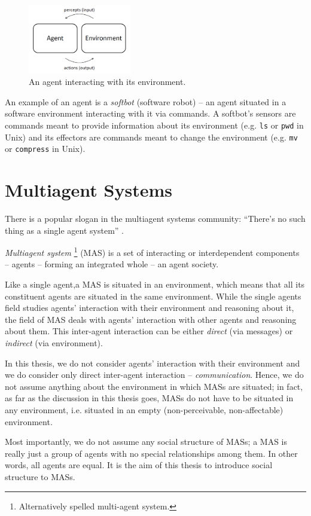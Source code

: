 \begin{figure}[h]
	\centering
	\includegraphics[width=0.4\textwidth]{images/agent-environment-interaction.png}
	\caption{An agent interacting with its environment.}
	\label{figure:agent-environment-interaction}
\end{figure}

An example of an agent is a \textit{softbot} (software robot) -- an agent situated in a software environment interacting with it via commands. A softbot's sensors are commands meant to provide information about its environment (e.g. \texttt{ls} or \texttt{pwd} in Unix) and its effectors are commands meant to change the environment (e.g. \texttt{mv} or \texttt{compress} in Unix).

\section{Multiagent Systems}

There is a popular slogan in the multiagent systems community: ``There's no such thing as a single agent system'' \cite{Wooldridge09}.

\textit{Multiagent system}
\footnote{Alternatively spelled multi-agent system.}
(MAS) is a set of interacting or interdependent components -- agents -- forming an integrated whole -- an agent society.

Like a single agent,a MAS is situated in an environment, which means that all its constituent agents are situated in the same environment.
While the single agents field studies agents' interaction with their environment and reasoning about it, the field of MAS deals with agents' interaction with other agents and reasoning about them.
This inter-agent interaction can be either \textit{direct} (via messages) or \textit{indirect} (via environment).

In this thesis, we do not consider agents' interaction with their environment and we do consider only direct inter-agent interaction -- \textit{communication}.
Hence, we do not assume anything about the environment in which MASs are situated; in fact, as far as the discussion in this thesis goes, MASs do not have to be situated in any environment, i.e. situated in an empty (non-perceivable, non-affectable) environment.

Most importantly, we do not assume any social structure of MASs; a MAS is really just a group of agents with no special relationships among them.
In other words, all agents are equal.
It is the aim of this thesis to introduce social structure to MASs.